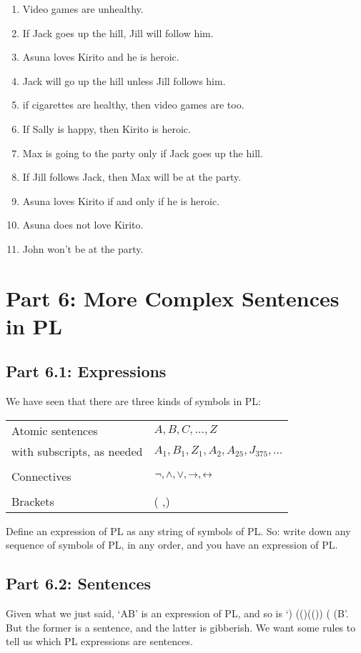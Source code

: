\begin{enumerate}
\item Video games are unhealthy.
\item If Jack goes up the hill, Jill will follow him.
\item Asuna loves Kirito and he is heroic. 
\item Jack will go up the hill unless Jill follows him.
\item if cigarettes are healthy, then video games are too. 
\item If Sally is happy, then Kirito is heroic. 
\item Max is going to the party only if Jack goes up the hill.
\item If Jill follows Jack, then Max will be at the party.
\item Asuna loves Kirito if and only if he is heroic.
\item Asuna does not love Kirito.
\item John won't be at the party. 
\end{enumerate}


\chapter{Part 6: More Complex Sentences in PL}
\section{Part 6.1: Expressions}
\label{s:Part 6.1: Expressions}
We have seen that there are three kinds of symbols in PL:
\begin{center}
\begin{tabular}{l l}
Atomic sentences & $A,B,C,\ldots,Z$\\
with subscripts, as needed & $A_1, B_1,Z_1,A_2,A_{25},J_{375},\ldots$\\
\\
Connectives & $\neg,\wedge,\vee,\rightarrow,\leftrightarrow$\\
\\
Brackets &( ,)\\
\end{tabular}
\end{center}
Define an expression of PL as any string of symbols of PL. So: write down any sequence of symbols of PL, in any order, and you have an expression of PL.
\section{Part 6.2: Sentences}
Given what we just said, ‘A\eand B’ is an expression of PL, and so is ‘\enot) (\eor ()\eand (\enot\enot()) ( (B’. But the former is a sentence, and the latter is gibberish. We want some rules to tell us which PL expressions are sentences.

